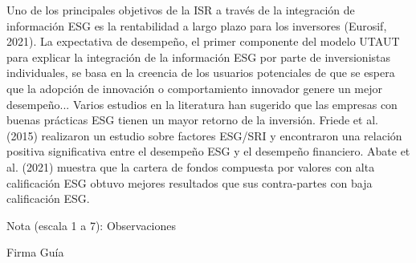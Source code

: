 \documentclass[11pt,letterpaper]{article}
\begin{document}
Uno de los principales objetivos de la ISR a través de la integración de información ESG es la rentabilidad a largo plazo para los inversores (Eurosif, 2021). La expectativa de desempeño, el primer componente del modelo UTAUT para explicar la integración de la información ESG por parte de inversionistas individuales, se basa en la creencia de los usuarios potenciales de que se espera que la adopción de innovación o comportamiento innovador genere un mejor desempeño... Varios estudios en la literatura han sugerido que las empresas con buenas prácticas ESG tienen un mayor retorno de la inversión. Friede et al. (2015) realizaron un estudio sobre factores ESG/SRI y encontraron una relación positiva significativa entre el desempeño ESG y el desempeño financiero. Abate et al. (2021) muestra que la cartera de fondos compuesta por valores con alta calificación ESG obtuvo mejores resultados que sus contra-partes con baja calificación ESG.



\vspace{3cm}


Nota (escala 1 a 7): 
\vspace{3cm}
Observaciones



\centering Firma Guía



    






\newpage











































\end{document}
